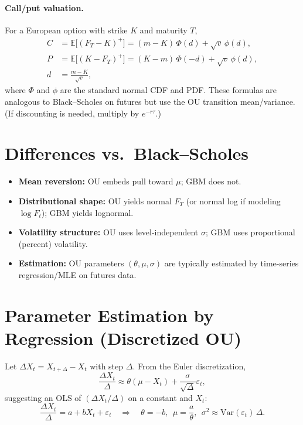 \documentclass[12pt]{article}
\begin{document}
\paragraph{Call/put valuation.} For a European option with strike $K$ and maturity $T$,
\begin{align}
  C &= \mathbb{E}\big[(F_T-K)^+\big]
  = (m-K)\,\Phi(d) + \sqrt{v}\,\phi(d),\\
  P &= \mathbb{E}\big[(K-F_T)^+\big]
  = (K-m)\,\Phi(-d) + \sqrt{v}\,\phi(d),\\
  d &= \frac{m-K}{\sqrt{v}},
\end{align}
where $\Phi$ and $\phi$ are the standard normal CDF and PDF. These formulas are analogous to Black–Scholes on futures but use the OU transition mean/variance. (If discounting is needed, multiply by $e^{-r\tau}$.)

\section{Differences vs.\ Black--Scholes}
\begin{itemize}
  \item \textbf{Mean reversion:} OU embeds pull toward $\mu$; GBM does not.
  \item \textbf{Distributional shape:} OU yields normal $F_T$ (or normal log if modeling $\log F_t$); GBM yields lognormal.
  \item \textbf{Volatility structure:} OU uses level-independent $\sigma$; GBM uses proportional (percent) volatility.
  \item \textbf{Estimation:} OU parameters $(\theta,\mu,\sigma)$ are typically estimated by time-series regression/MLE on futures data.
\end{itemize}

\section{Parameter Estimation by Regression (Discretized OU)}
Let $\Delta X_t = X_{t+\Delta}-X_t$ with step $\Delta$. From the Euler discretization,
\[
  \frac{\Delta X_t}{\Delta} \approx \theta(\mu - X_t) + \frac{\sigma}{\sqrt{\Delta}}\varepsilon_t,
\]
suggesting an OLS of $(\Delta X_t/\Delta)$ on a constant and $X_t$:
\[
  \frac{\Delta X_t}{\Delta} = a + b X_t + \varepsilon_t
  \quad\Rightarrow\quad
  \theta = -b,\ \ \mu = \frac{a}{\theta},\ \
  \sigma^2 \approx \mathrm{Var}(\varepsilon_t)\,\Delta.
\]
\end{document}
